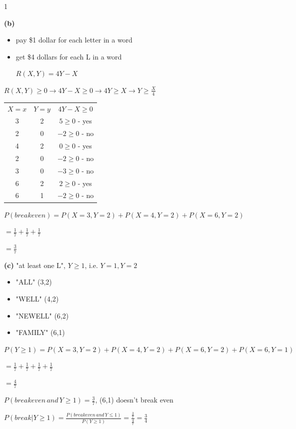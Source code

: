 \documentclass[12 pt]{article}
\begin{document}
\begin{exercise}{1}
    \hfill

    \textbf{(b)}
    \begin{itemize}
        \item pay \$1 dollar for each letter in a word
        \item get \$4 dollars for each L in a word

        $R(X,Y) = 4Y - X$
    \end{itemize}

    $R(X,Y) \geq 0 \xrightarrow{} 4Y - X \geq 0 \xrightarrow{} 4Y \geq X \xrightarrow{} Y \geq \frac{X}{4}$

    \hfill

    \begin{tabular}{c|c|c}
        $X=x$ & $Y=y$ & $4Y - X \geq 0$ \\
        3 & 2 & $5 \geq 0$ - yes \\
        2 & 0 & $-2 \geq 0$ - no \\
        4 & 2 & $0 \geq 0$ - yes \\
        2 & 0 & $-2 \geq 0$ - no \\
        3 & 0 & $-3 \geq 0$ - no \\
        6 & 2 & $2 \geq 0$ - yes \\
        6 & 1 & $-2 \geq 0$ - no \\       
    \end{tabular}

    \hfill

    $P(break even) = P(X=3, Y=2) + P(X=4, Y=2) + P(X=6,Y=2)$
    
    $= \frac{1}{7} + \frac{1}{7} + \frac{1}{7}$

    $= \frac{3}{7}$

    \hfill

    \textbf{(c)}
    "at least one L", $Y \geq 1$, i.e. $Y=1, Y=2$

    \begin{itemize}
        \item "ALL" (3,2)
        \item "WELL" (4,2)
        \item "NEWELL" (6,2)
        \item "FAMILY" (6,1)
    \end{itemize}

    $P(Y \geq 1) = P(X=3, Y=2) + P(X=4, Y=2) + P(X=6, Y=2) + P(X=6, Y=1)$

    $= \frac{1}{7} + \frac{1}{7} + \frac{1}{7} + \frac{1}{7}$

    $= \frac{4}{7}$

    $P(breakeven \, and \, Y \geq 1) = \frac{3}{7}$, (6,1) doesn't break even

    $P(break|Y \geq 1) = \frac{P(break even \, and \, Y \leq 1)}{P(Y \geq 1)} = \frac{\frac{3}{7}}{\frac{4}{7}} = \frac{3}{4}$

    \hfill
    \end{exercise}
\end{document}
